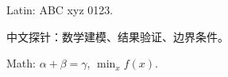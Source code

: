 \documentclass{article}
\begin{document}
Latin: ABC xyz 0123.\par
中文探针：数学建模、结果验证、边界条件。\par
Math: $\alpha+\beta=\gamma$, $\min_x f(x)$.
\end{document}
